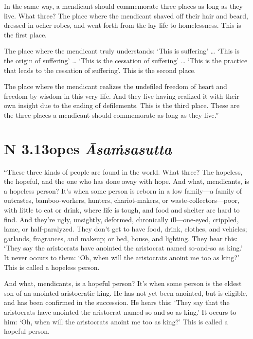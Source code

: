 \documentclass[12pt,openany]{book}%
\newcommand*{\suttatitleacronym}[1]{\smaller[2]{#1}\vspace*{.3em}}
\newcommand*{\suttatitletranslation}[1]{\linebreak{#1}}
\newcommand*{\suttatitleroot}[1]{\linebreak\smaller[2]\itshape{#1}}
\newcommand*{\tocacronym}[1]{\hspace*{-3.3em}{#1}\quad}
\newcommand*{\toctranslation}[1]{#1}
\newcommand*{\tocroot}[1]{(\textit{#1})}
\begin{document}
In the same way, a mendicant should commemorate three places as long as they live. What three? The place where the mendicant shaved off their hair and beard, dressed in ocher robes, and went forth from the lay life to homelessness. This is the first place. 

The place where the mendicant truly understands: ‘This is suffering’ … ‘This is the origin of suffering’ … ‘This is the cessation of suffering’ … ‘This is the practice that leads to the cessation of suffering’. This is the second place. 

The place where the mendicant realizes the undefiled freedom of heart and freedom by wisdom in this very life. And they live having realized it with their own insight due to the ending of defilements. This is the third place. These are the three places a mendicant should commemorate as long as they live.” 

%
\section*{{\suttatitleacronym AN 3.13}{\suttatitletranslation Hopes }{\suttatitleroot Āsaṁsasutta}}
\addcontentsline{toc}{section}{\tocacronym{AN 3.13} \toctranslation{Hopes } \tocroot{Āsaṁsasutta}}

“These three kinds of people are found in the world. What three? The hopeless, the hopeful, and the one who has done away with hope. And what, mendicants, is a hopeless person? It’s when some person is reborn in a low family—a family of outcastes, bamboo-workers, hunters, chariot-makers, or waste-collectors—poor, with little to eat or drink, where life is tough, and food and shelter are hard to find. And they’re ugly, unsightly, deformed, chronically ill—one-eyed, crippled, lame, or half-paralyzed. They don’t get to have food, drink, clothes, and vehicles; garlands, fragrances, and makeup; or bed, house, and lighting. They hear this: ‘They say the aristocrats have anointed the aristocrat named so-and-so as king.’ It never occurs to them: ‘Oh, when will the aristocrats anoint me too as king?’ This is called a hopeless person. 

And what, mendicants, is a hopeful person? It’s when some person is the eldest son of an anointed aristocratic king. He has not yet been anointed, but is eligible, and has been confirmed in the succession. He hears this: ‘They say that the aristocrats have anointed the aristocrat named so-and-so as king.’ It occurs to him: ‘Oh, when will the aristocrats anoint me too as king?’ This is called a hopeful person. 
\end{document}
